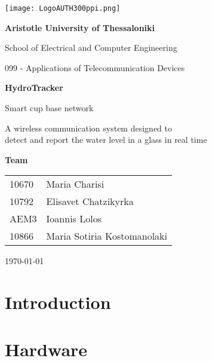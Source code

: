 \documentclass{article}
\begin{document}
\begin{titlepage}
    \centering
    \texttt{[image: LogoAUTH300ppi.png]}
    \par\vspace{2cm}

    {\Large \textbf{Aristotle University of Thessaloniki} \par}
    \vspace{0.5cm}
    {\large School of Electrical and Computer Engineering\par}
    {\large 099 - Applications of Telecommunication Devices\par}
    \vspace{3cm}

    {\Large \textbf{HydroTracker} \par}
    {\large Smart cup base network \par}
    { A wireless communication system designed to \\ detect and report the water level in a glass in real time \par}
    \vspace{3cm}

    {\large \textbf{Team} \par}
    \vspace{0.5cm}
    \begin{tabular}{ll}
    10670 & Maria Charisi \\
    10792 & Elisavet Chatzikyrka \\
    AEM3 & Ioannis Lolos\\
    10866 & Maria Sotiria Kostomanolaki \\
    \end{tabular}
    \par\vspace{3cm}

    {\today \par}

\end{titlepage}

\tableofcontents 

\newpage 

\section{Introduction}


\newpage
\section{Hardware}

\end{document}
